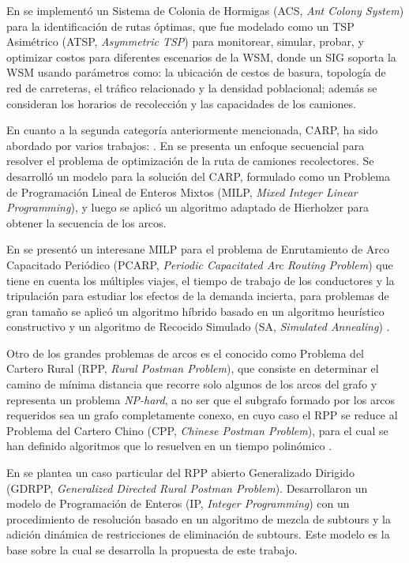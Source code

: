 En \citet{Karadimas2007OptimalAlgorithm} se implementó un Sistema de Colonia de Hormigas (ACS, \textit{Ant Colony System}) para la identificación de rutas óptimas, que fue modelado como un TSP Asimétrico (ATSP, \textit{Asymmetric TSP}) para monitorear, simular, probar, y optimizar costos para diferentes escenarios de la WSM, donde un SIG soporta la WSM usando parámetros como: la ubicación de cestos de basura, topología de red de carreteras, el tráfico relacionado y la densidad poblacional; además se consideran los horarios de recolección y las capacidades de los camiones.

En cuanto a la segunda categoría anteriormente mencionada, CARP, ha sido abordado por varios trabajos: \citet{Vecchi2016ACollection,Tirkolaee2018ATime,Braier2017AnArgentina}. En \citet{Vecchi2016ACollection} se presenta un enfoque secuencial para resolver el problema de optimización de la ruta de camiones recolectores. Se desarrolló un modelo para la solución del CARP, formulado como un Problema de Programación Lineal de Enteros Mixtos (MILP, \textit{Mixed Integer Linear Programming}), y luego se aplicó un algoritmo adaptado de Hierholzer para obtener la secuencia de los arcos. 

En \citet{Tirkolaee2018ATime} se presentó un interesane MILP para el problema de Enrutamiento de Arco Capacitado Periódico (PCARP, \textit{Periodic Capacitated Arc Routing Problem}) que tiene en cuenta los múltiples viajes, el tiempo de trabajo de los conductores y la tripulación para estudiar los efectos de la demanda incierta, para problemas de gran tamaño se aplicó un algoritmo híbrido basado en un algoritmo heurístico constructivo y un algoritmo de Recocido Simulado (SA, \textit{Simulated Annealing}) \citep{Bertsimas1993SimulatedAnnealing}.

Otro de los grandes problemas de arcos es el conocido como Problema del Cartero Rural (RPP, \textit{Rural Postman Problem}), que consiste en determinar el camino de mínima distancia que recorre solo algunos de los arcos del grafo y representa un problema \textit{NP-hard}, a no ser que el subgrafo formado por los arcos requeridos sea un grafo completamente conexo, en cuyo caso el RPP se reduce al Problema del Cartero Chino (CPP, \textit{Chinese Postman Problem}), para el cual se han definido algoritmos que lo resuelven en un tiempo polinómico \citep{CalvinoM2011CooperacionPanoramica}.

En \citet{Braier2017AnArgentina} se plantea un caso particular del RPP abierto Generalizado Dirigido (GDRPP, \textit{Generalized Directed Rural Postman Problem}). Desarrollaron un modelo de Programación de Enteros (IP, \textit{Integer Programming}) con un procedimiento de resolución basado en un algoritmo de mezcla de subtours y la adición dinámica de restricciones de eliminación de subtours. Este modelo es la base sobre la cual se desarrolla la propuesta de este trabajo.

